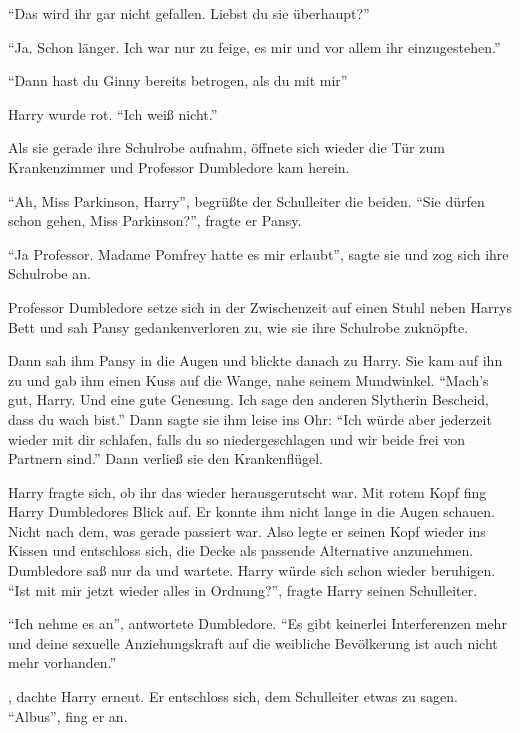 \enquote{Das wird ihr gar nicht gefallen. Liebst du sie überhaupt?}

\enquote{Ja. Schon länger. Ich war nur zu feige, es mir und vor allem ihr einzugestehen.}

\enquote{Dann hast du Ginny bereits betrogen, als du mit mir\abs}

Harry wurde rot. \enquote{Ich weiß nicht.}

Als sie gerade ihre Schulrobe aufnahm, öffnete sich wieder die Tür zum Krankenzimmer und Professor Dumbledore kam herein.

\enquote{Ah, Miss Parkinson, Harry}, begrüßte der Schulleiter die beiden. \enquote{Sie dürfen schon gehen, Miss Parkinson?}, fragte er Pansy.

\enquote{Ja Professor. Madame Pomfrey hatte es mir erlaubt}, sagte sie und zog sich ihre Schulrobe an.

Professor Dumbledore setze sich in der Zwischenzeit auf einen Stuhl neben Harrys Bett und sah Pansy gedankenverloren zu, wie sie ihre Schulrobe zuknöpfte.

Dann sah ihm Pansy in die Augen und blickte danach zu Harry. Sie kam auf ihn zu und gab ihm einen Kuss auf die Wange, nahe seinem Mundwinkel. \enquote{Mach’s gut, Harry. Und eine gute Genesung. Ich sage den anderen Slytherin Bescheid, dass du wach bist.} Dann sagte sie ihm leise ins Ohr: \enquote{Ich würde aber jederzeit wieder mit dir schlafen, falls du so niedergeschlagen und wir beide frei von Partnern sind.} Dann verließ sie den Krankenflügel.

Harry fragte sich, ob ihr das wieder herausgerutscht war. Mit rotem Kopf fing Harry Dumbledores Blick auf. Er konnte ihm nicht lange in die Augen schauen. Nicht nach dem, was gerade passiert war. Also legte er seinen Kopf wieder ins Kissen und entschloss sich, die Decke als passende Alternative anzunehmen.  Dumbledore saß nur da und wartete. Harry würde sich schon wieder beruhigen. \enquote{Ist mit mir jetzt wieder alles in Ordnung?}, fragte Harry seinen Schulleiter.

\enquote{Ich nehme es an}, antwortete Dumbledore. \enquote{Es gibt keinerlei Interferenzen mehr und deine sexuelle Anziehungskraft auf die weibliche Bevölkerung ist auch nicht mehr vorhanden.}

, dachte Harry erneut. Er entschloss sich, dem Schulleiter etwas zu sagen. \enquote{Albus}, fing er an.

